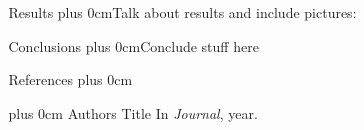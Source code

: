 \documentclass[final,hyperref={pdfpagelabels=false}]{beamer}
\renewcommand{\raggedright}{\leftskip=0.5cm \rightskip=0.5cm plus 0cm}
\begin{document}
\begin{frame}{}
\begin{columns}[t]
\begin{column}{.48\linewidth}
      \end{column}
      \begin{column}{.48\linewidth}
        \begin{block}{\Large Results}
          \raggedright Talk about results and include pictures: \vskip5cm
          \vskip5.5cm
        \end{block}
        
        \begin{block}{\Large Conclusions}
          \raggedright Conclude stuff here
        \end{block}
        \begin{block}{References}
          \raggedright
          \footnotesize
          \begin{thebibliography}{2}
            \raggedright
            Authors
            \newblock Title
            \newblock In \emph{Journal}, year.
          \end{thebibliography}
        \end{block}
      \end{column}
    \end{columns}
  \end{frame}
\end{document}
